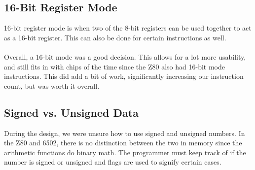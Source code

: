 \documentclass[conference]{IEEEtran}
\begin{document}
\subsection{16-Bit Register Mode}
16-bit register mode is when two of the 8-bit registers can be used together to act as a 16-bit register. This can also be done for certain instructions as well.\\

\\

Overall, a 16-bit mode was a good decision. This allows for a lot more usability, and still fits in with chips of the time since the Z80 also had 16-bit mode instructions. This did add a bit of work, significantly increasing our instruction count,  but was worth it overall.

\subsection{Signed vs. Unsigned Data}

During the design, we were unsure how to use signed and unsigned numbers. In the Z80 and 6502, there is no distinction between the two in memory since the arithmetic functions do binary math. The programmer must keep track of if the number is signed or unsigned and flags are used to signify certain cases.\\

\\
\end{document}
